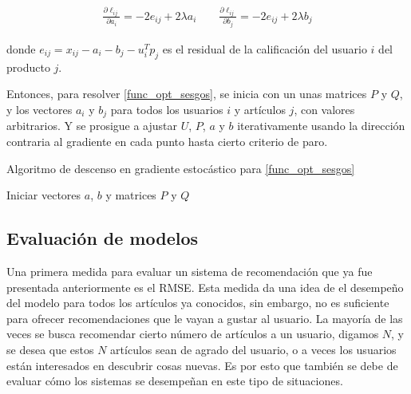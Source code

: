 \[
\begin{split}
\frac{\partial \ell_{ij}}{\partial a_i} = -2 e_{ij} + 2 \lambda a_i 
\qquad
\frac{\partial \ell_{ij}}{\partial b_j} = -2 e_{ij} + 2 \lambda b_j
\end{split}
\]

donde $e_{ij} =  x_{ij} - a_i - b_j - u_i^T p_j$ es el residual de la calificación del usuario $i$ del producto $j$.

Entonces, para resolver \ref{func_opt_sesgos}, se inicia con un unas matrices $P$ y $Q$, y los vectores $a_i$ y $b_j$ para todos los usuarios $i$ y artículos $j$, con valores arbitrarios. Y se prosigue a ajustar $U$, $P$, $a$ y $b$ iterativamente usando la dirección contraria al gradiente en cada punto hasta cierto criterio de paro.

\begin{algorithm}[H]
 \caption{Algoritmo de descenso en gradiente estocástico para \ref{func_opt_sesgos}}
    \SetAlgoLined
    Iniciar vectores $a$, $b$ y matrices $P$ y $Q$\\
\end{algorithm}

\subsection{Evaluación de modelos}\label{sec:evaluacion_modelos}

Una primera medida para evaluar un sistema de recomendación que ya fue presentada anteriormente es el RMSE. Esta medida da una idea de el desempeño del modelo para todos los artículos ya conocidos, sin embargo, no es suficiente para ofrecer recomendaciones que le vayan a gustar al usuario. La mayoría de las veces se busca recomendar cierto número de artículos a un usuario, digamos $N$, y se desea que estos $N$ artículos sean de agrado del usuario, o a veces los usuarios están interesados en descubrir cosas nuevas. Es por esto que también se debe de evaluar cómo los sistemas se desempeñan en este tipo de situaciones.

